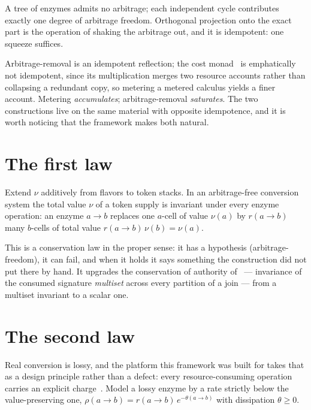 A tree of enzymes admits no arbitrage; each independent cycle contributes
exactly one degree of arbitrage freedom.  Orthogonal projection onto the
exact part is the operation of shaking the arbitrage out, and it is
idempotent: one squeeze suffices.

\begin{remark}
\label{rmk:twomonads}
Arbitrage-removal is an idempotent reflection; the cost
monad~\cite[\S9]{CE} is emphatically not idempotent, since its
multiplication merges two resource accounts rather than collapsing a
redundant copy, so metering a metered calculus yields a finer account.
Metering \emph{accumulates}; arbitrage-removal \emph{saturates}.  The two
constructions live on the same material with opposite idempotence, and it
is worth noticing that the framework makes both natural.
\end{remark}

\section{The first law}

\begin{proposition}
\label{prop:firstlaw}
Extend $\nu$ additively from flavors to token stacks.  In an
arbitrage-free conversion system the total value $\nu$ of a token supply
is invariant under every enzyme operation: an enzyme $a \to b$ replaces
one $a$-cell of value $\nu(a)$ by $r(a\to b)$ many $b$-cells of total
value $r(a\to b)\,\nu(b) = \nu(a)$.
\end{proposition}

This is a conservation law in the proper sense: it has a hypothesis
(arbitrage-freedom), it can fail, and when it holds it says something the
construction did not put there by hand.  It upgrades the conservation of
authority of~\cite[Prop.~4.7]{CARho} --- invariance of the consumed
signature \emph{multiset} across every partition of a join --- from a
multiset invariant to a scalar one.

\section{The second law}

Real conversion is lossy, and the platform this framework was built for
takes that as a design principle rather than a defect: every
resource-consuming operation carries an explicit charge~\cite{CARho}.
Model a lossy enzyme by a rate strictly below the value-preserving one,
$\rho(a\to b) = r(a\to b)\,e^{-\theta(a\to b)}$ with dissipation
$\theta \geq 0$.

